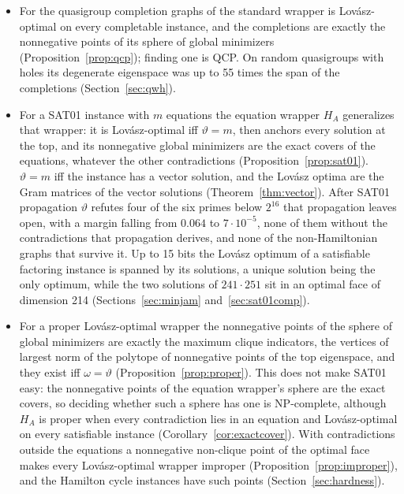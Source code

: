 \documentclass[11pt]{article}
\theoremstyle{definition}
\theoremstyle{remark}
\begin{document}
\begin{itemize}
maximum cliques, 11 do
not admit anchoring all of them at a nonzero level; of the remaining 20,
14 have $\vartheta=\omega$ and 6 have $\vartheta>\omega$
(Section~\ref{sec:comp}).
\item For the quasigroup completion graphs of \cite{BP03} the standard
wrapper is Lov\'asz-optimal on every completable instance, and the
completions are exactly the nonnegative points of its sphere of global
minimizers (Proposition~\ref{prop:qcp}); finding one is QCP. On random
quasigroups with holes its degenerate eigenspace was up to 55 times the
span of the completions (Section~\ref{sec:qwh}).
\item For a SAT01 instance with $m$ equations the equation wrapper $H_A$
generalizes that wrapper: it is Lov\'asz-optimal iff $\vartheta=m$, then
anchors every solution at the top, and its nonnegative global minimizers are
the exact covers of the equations, whatever the other contradictions
(Proposition~\ref{prop:sat01}). $\vartheta=m$ iff the instance has a vector
solution, and the Lov\'asz optima are the Gram matrices of the vector
solutions (Theorem~\ref{thm:vector}). After SAT01 propagation $\vartheta$
refutes four of the six primes below $2^{16}$ that propagation leaves open,
with a margin falling from $0.064$ to $7\cdot10^{-5}$, none of them without
the contradictions that propagation derives, and none of the non-Hamiltonian
graphs that survive it. Up to 15 bits the Lov\'asz optimum of a satisfiable
factoring instance is spanned by its solutions, a unique solution being the
only optimum, while the two solutions of $241\cdot251$ sit in an optimal
face of dimension 214 (Sections~\ref{sec:minjam}
and~\ref{sec:sat01comp}).
\item For a proper Lov\'asz-optimal wrapper the nonnegative points of the
sphere of global minimizers are exactly the maximum clique indicators, the
vertices of largest norm of the polytope of nonnegative points of the top
eigenspace, and they exist iff $\omega=\vartheta$
(Proposition~\ref{prop:proper}). This does not make SAT01 easy: the
nonnegative points of the equation wrapper's sphere are the exact covers, so
deciding whether such a sphere has one is NP-complete, although $H_A$ is
proper when every contradiction lies in an equation and Lov\'asz-optimal on
every satisfiable instance (Corollary~\ref{cor:exactcover}). With
contradictions outside the equations a nonnegative non-clique point of the
optimal face makes every Lov\'asz-optimal wrapper improper
(Proposition~\ref{prop:improper}), and the Hamilton cycle instances have
such points (Section~\ref{sec:hardness}).

\end{itemize}
\end{document}
